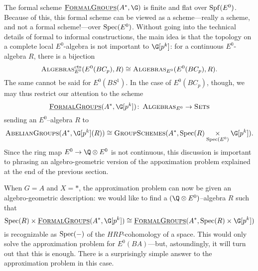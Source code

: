 The formal scheme $\InternalHom{FormalGroups}(A^*,\G)$ is finite and flat over $\operatorname{Spf}(E^0)$. Because of this, this formal scheme can be viewed as a scheme---really a scheme, and not a formal scheme!---over $\operatorname{Spec}(E^0)$. Without going into the technical details of formal to informal constructions, the main idea is that the topology on a complete local $E^0$-algebra is not important to $\G[p^k]$: for a continuous $E^0$-algebra $R$, there is a bijection
\[
\normalfont\textsc{Algebras}_{E^0}^{\mathrm{cts}}(E^0(BC_p),R) \cong \normalfont\textsc{Algebras}_{E^0}(E^0(BC_p),R).
\]
The same cannot be said for $E^0(BS^1)$.  In the case of $E^0(BC_p)$, though, we may thus restrict our attention to the scheme
\[
\InternalHom{FormalGroups}(A^*,\G[p^k]) \co \CatOf{Algebras}_{E^0} \rightarrow \CatOf{Sets}
\]
sending an $E^0$--algebra $R$ to
\[
\CatOf{AbelianGroups}(A^*, \G[p^k](R)) \cong \CatOf{GroupSchemes}(A^*, \Spec(R) \underset{{\Spec(E^0)}}{\times} \G[p^k]).
\]
Since the ring map $E^0 \rightarrow \Q \otimes E^0$ is not continuous, this discussion is important to phrasing an algebro-geometric version of the appoximation problem explained at the end of the previous section.

When $G = A$ and $X = *$, the approximation problem can now be given an algebro-geometric description: we would like to find a $(\Q \otimes E^0)$--algebra $R$ such that 
\[
\Spec(R) \times \InternalHom{FormalGroups}(A^*, \G[p^k]) \cong  \InternalHom{FormalGroups}(A^*, \Spec(R) \times \G[p^k])
\]
is recognizable as $\operatorname{Spec}(-)$ of the $HRP$-cohomology of a space. This would only solve the approximation problem for $E^0(BA)$---but, astoundingly, it will turn out that this is enough. There is a surprisingly simple answer to the approximation problem in this case. 

